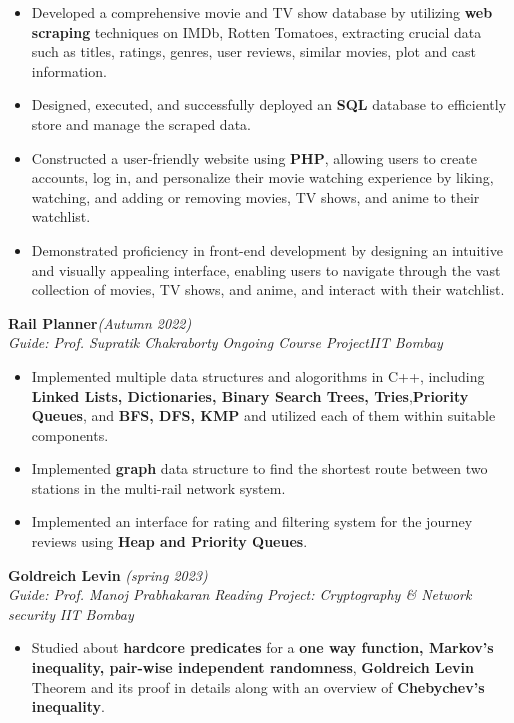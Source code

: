\documentclass[10 pt]{article}
\begin{document}
		\begin{itemize}[itemsep = -0.8 mm, leftmargin=*]
		\vspace{-16pt}
		\item Developed a comprehensive movie and TV show database by utilizing \textbf{web scraping} techniques on IMDb, Rotten Tomatoes, extracting crucial data such as titles, ratings, genres, user reviews, similar movies, plot and cast information.
		\item Designed, executed, and successfully deployed an \textbf{SQL} database to efficiently store and manage the scraped data.
		\item Constructed a user-friendly website using \textbf{PHP}, allowing users to create accounts, log in, and personalize their movie watching experience by liking, watching, and adding or removing movies, TV shows, and anime to their watchlist.
		\item  Demonstrated proficiency in front-end development by designing an intuitive and visually appealing interface, enabling users to navigate through the vast collection of movies, TV shows, and anime, and interact with their  watchlist.
	\end{itemize}
{\selectfont
		\textbf{{Rail Planner}}\hfill{\sl \small (Autumn 2022)}\\
	}{\it Guide: Prof. Supratik Chakraborty \textbar} {\it Ongoing Course Project}\hfill{\sl \small IIT Bombay}\\
	\begin{itemize}[itemsep = -0.8 mm, leftmargin=*]
		\vspace{-16pt}
		\item Implemented multiple data structures and alogorithms in C++, including \textbf{Linked Lists, Dictionaries, Binary Search Trees, Tries},\textbf{Priority Queues}, and \textbf{BFS, DFS, KMP} and utilized each of them within suitable components.
\item Implemented {\bf graph} data structure to find the shortest route between two stations in the multi-rail network system.
\item Implemented an interface for rating and filtering system for the journey reviews using \textbf{Heap and Priority Queues}.
	\end{itemize}
  	{\selectfont
		\textbf{{Goldreich Levin }}\hfill{\sl \small (spring 2023)}\\
	}{\it Guide: Prof. Manoj Prabhakaran \textbar} {\it Reading Project:  Cryptography \& Network security }\hfill{\sl \small IIT Bombay}\\
	\begin{itemize}[itemsep = -0.8 mm, leftmargin=*]
		\vspace{-16pt}
		\item  Studied about \textbf{hardcore predicates} for a \textbf{one way function, Markov’s inequality, pair-wise
independent randomness}, \textbf{Goldreich Levin} Theorem and its
proof in details along with an overview of \textbf{Chebychev’s inequality}.
	\end{itemize}
 \newpage
 \vspace{-16pt}
\end{document}

